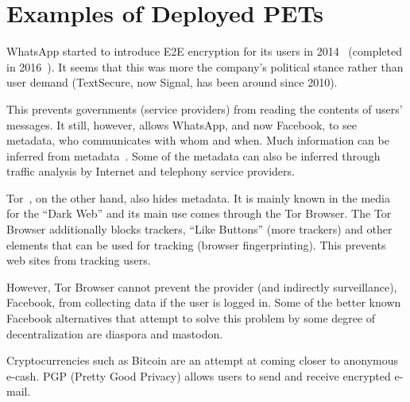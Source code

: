 





\section{Examples of Deployed \acp{PET}}

WhatsApp started to introduce \ac{E2E} encryption for its users in
2014~\cite{WhatsAppIntroducesE2Eencryption} (completed in
2016~\cite{WhatsAppE2Ecomplete}).  It seems that this was more the
company's political stance rather than user demand (TextSecure, now
Signal, has been around since 2010).

This prevents governments (\ie service providers) from reading the
contents of users' messages.  It still, however, allows WhatsApp, and
now Facebook, to see metadata, \ie who communicates with whom and
when. Much information can be inferred from
metadata~\cite{DevilInMetadata}.  Some of the metadata can also be
inferred through traffic analysis by \eg Internet and telephony
service providers.

Tor~\cite{Tor}, on the other hand, also hides metadata.
It is mainly known in the media for the \enquote{Dark Web}%
and its main use comes through the Tor Browser.%
The Tor Browser additionally blocks trackers, \enquote{Like Buttons} (\ie more 
trackers) and other elements that can be used for tracking (\eg browser 
fingerprinting).
This prevents web sites from tracking users.

However, Tor Browser cannot prevent the provider (and indirectly surveillance), \eg Facebook, 
from collecting data if the user is logged in. Some of the better
known Facebook alternatives that attempt to solve this problem by
some degree of decentralization are  diaspora and mastodon. 

Cryptocurrencies such as Bitcoin are an attempt at coming closer to
anonymous e-cash. PGP (Pretty Good Privacy) allows users to send and
receive encrypted e-mail.


